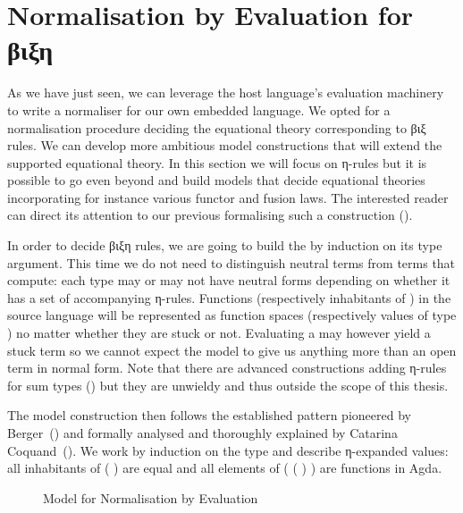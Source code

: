 \section{Normalisation by Evaluation for βιξη}
\label{normbye}

As we have just seen, we can leverage the host language's evaluation
machinery to write a normaliser for our own embedded language. We opted
for a normalisation procedure deciding the equational theory corresponding
to βιξ rules. We can develop more ambitious model constructions that will
extend the supported equational theory.
%
In this section we will focus on η-rules but it is possible to go even
beyond and build models that decide equational theories incorporating
for instance various functor and fusion laws. The interested reader can
direct its attention to our previous formalising such a construction
(\citeyear{DBLP:conf/icfp/AllaisMB13}).

In order to decide βιξη rules, we are going to build the  by
induction on its type argument. This time we do not need to distinguish
neutral terms from terms that compute: each type may or may not have
neutral forms depending on whether it has a set of accompanying η-rules.
%
Functions (respectively inhabitants of ) in the source language
will be represented as function spaces (respectively values of type )
no matter whether they are stuck or not. Evaluating a  may however
yield a stuck term so we cannot expect the model to give us anything more than
an open term in normal form. Note that there are advanced constructions
adding η-rules for sum types
(\cite{DBLP:conf/tlca/Ghani95,DBLP:conf/flops/AltenkirchU04,DBLP:conf/tlca/Lindley07})
but they are unwieldy and thus outside the scope of this thesis.


The model construction then follows the established pattern pioneered by
Berger~(\citeyear{berger1993program}) and formally analysed and thoroughly
explained by Catarina Coquand~(\citeyear{coquand2002formalised}). We work
by induction on the type and describe η-expanded values: all inhabitants
of (  ) are equal and all elements
of ( (  ) ) are functions in Agda.

\begin{figure}[h]
\caption{Model for Normalisation by Evaluation\label{fig:nbemodel}}
\end{figure}

